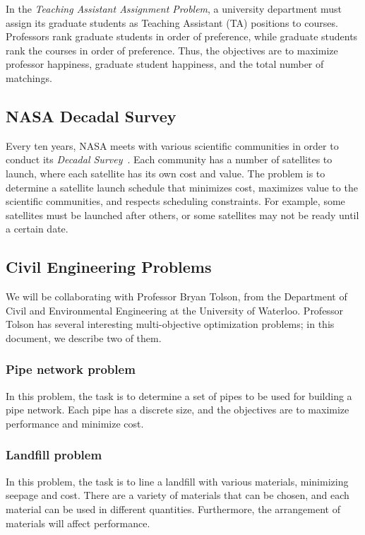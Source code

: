 \documentclass[11pt]{article}
\begin{document}
In the \textit{Teaching Assistant Assignment Problem}, a university
department must assign its graduate students as Teaching Assistant (TA)
positions to courses. Professors rank graduate students in order of
preference, while graduate students rank the courses in order of
preference. Thus, the objectives are to maximize professor happiness,
graduate student happiness, and the total number of matchings.

\subsection{NASA Decadal Survey}\label{sec:decadal_survey}

Every ten years, NASA meets with various scientific communities in
order to conduct its \textit{Decadal Survey}~\cite{ref:nasa11}. Each
community has a number of satellites to launch, where each satellite
has its own cost and value. The problem is to determine a satellite
launch schedule that minimizes cost, maximizes value to the scientific
communities, and respects scheduling constraints. For example, some
satellites must be launched after others, or some satellites may not be
ready until a certain date.

\subsection{Civil Engineering Problems}\label{sec:civ_eng}

We will be collaborating with Professor Bryan Tolson, from the
Department of Civil and Environmental Engineering at the University of
Waterloo. Professor Tolson has several interesting multi-objective
optimization problems; in this document, we describe two of them.

\subsubsection{Pipe network problem}\label{sec:pipes}

In this problem, the task is to determine a set of pipes to be used for
building a pipe network. Each pipe has a discrete size, and the
objectives are to maximize performance and minimize cost.

\subsubsection{Landfill problem}\label{sec:landfill}

In this problem, the task is to line a landfill with various materials,
minimizing seepage and cost. There are a variety of materials that can
be chosen, and each material can be used in different quantities.
Furthermore, the arrangement of materials will affect performance.
\end{document}
